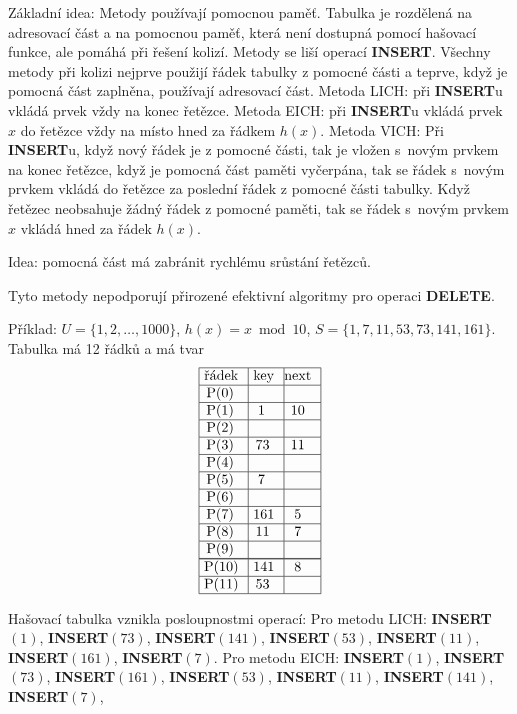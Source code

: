 \documentclass[a4paper,12pt]{article}
\begin{document}
Základní idea: Metody používají pomocnou paměť. 
Tabulka je rozdělená na adresovací část a na pomocnou 
paměť, která není dostupná pomocí hašovací funkce, 
ale pomáhá při řešení kolizí. Metody se liší operací 
{\bf INSERT}. Všechny metody při kolizi nejprve použijí řádek 
tabulky z pomocné části a teprve, když je pomocná část 
zaplněna, používají adresovací část.\newline 
Metoda LICH: při {\bf INSERT}u vkládá prvek vždy na konec 
ře\-těz\-ce.\newline 
Metoda EICH: při {\bf INSERT}u vkládá prvek $x$ do řetězce vždy 
na místo hned za řádkem $h(x)$.\newline 
Metoda VICH: Při {\bf INSERT}u, když nový řádek je z 
pomocné části, tak je vložen s~novým prvkem na konec 
řetězce, když je pomocná část paměti vyčer\-pá\-na, tak se 
řádek s~novým prvkem vkládá do řetězce za posled\-ní 
řádek z pomocné části tabulky. Když řetězec neobsahuje 
žádný řádek z pomocné paměti, tak se řádek s~novým  prvkem $
x$ vkládá hned za řádek $h(x)$. 

Idea: pomocná část má zabránit rychlému 
srůstání řetězců.

Tyto metody nepodporují přirozené efektivní algoritmy 
pro ope\-raci {\bf DELETE}.

Příklad: $U=\{1,2,\dots,1000\}$, $h(x)=x\bmod10$,\newline 
$S=\{1,7,11,53,73,141,161\}$. Tabulka má 12 řádků a 
má tvar
$$\vtop{\offinterlineskip\halign {\strut\vrule\ # & \vrule\ # & \vrule \hfil # \hfil \vrule\cr\noalign{\hrule}řádek & key & next \hfil \cr\noalign{\hrule}P(0) & &\hfill \cr\noalign{\hrule}P(1) & 1 & 10 \cr\noalign{\hrule}P(2) & &\hfill \cr\noalign{\hrule}P(3) & 73 & 11 \cr\noalign{\hrule}P(4) &  &\hfill \cr\noalign{\hrule}P(5) & 7 & \hfill \cr\noalign{\hrule}P(6) & &\hfill \cr\noalign{\hrule}P(7) & 161 & 5 \cr\noalign{\hrule}P(8) & 11 & 7 \cr\noalign{\hrule}P(9) & &\hfill \cr\noalign{\hrule}\noalign{\hrule}P(10) & 141 & 8 \cr\noalign{\hrule}P(11) & 53 & \cr\noalign{\hrule}}}$$

Hašovací tabulka vznikla posloupnostmi operací:\newline 
Pro metodu LICH:\newline 
{\bf INSERT$(1)$}, {\bf INSERT$(73)$}, {\bf INSERT$(141)$}, 
{\bf INSERT$(53)$}, {\bf INSERT$(11)$},\newline 
{\bf INSERT$(161)$}, {\bf INSERT$(7)$}.\newline 
Pro metodu EICH:\newline 
{\bf INSERT$(1)$}, {\bf INSERT$(73)$}, {\bf INSERT$(161)$}, 
{\bf INSERT$(53)$}, {\bf INSERT$(11)$},\newline 
{\bf INSERT$(141)$}, {\bf INSERT$(7)$},
\end{document}
